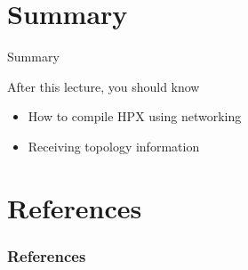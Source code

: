 \documentclass[\classoption]{beamer}
\begin{document}
\section{Summary}
\begin{frame}{Summary}
\begin{block}{After this lecture, you should know}
\begin{itemize}
\item How to compile HPX using networking
\item Receiving topology information
\end{itemize}
\end{block}
\end{frame}

\section{References}

\begin{frame}[t, allowframebreaks]
\frametitle{References}


\end{frame}
\end{document}
